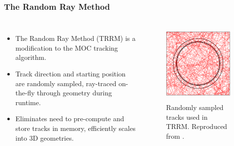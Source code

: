 \begin{frame}
  \frametitle{The Random Ray Method}
    \begin{columns}
        \column[t]{5cm}
            \begin{itemize}
                \item The Random Ray Method (TRRM) is a modification to the MOC tracking
                    algorithm.
                \item Track direction and starting position are randomly sampled, ray-traced
                    on-the-fly through geometry during runtime.
                \item Eliminates need to pre-compute and store tracks in memory, efficiently
                    scales into 3D geometries. 
            \end{itemize}
        \column[t]{5cm}
            \begin{figure}[htbp!]
              \begin{center}
                \includegraphics[height=4cm]{./figs/tramm-csg-rr.png}
              \end{center}
              \caption{Randomly sampled tracks used in TRRM. Reproduced from \cite{tramm_development_2018}.}
              \label{fig:moc-tracks}
            \end{figure}
      \end{columns}
\end{frame}
